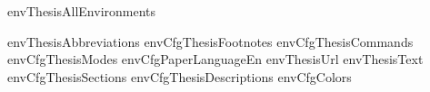 \startenvironment envThesisAllEnvironments

\environment envThesisAbbreviations
\environment envCfgThesisFootnotes
\environment envCfgThesisCommands
\environment envCfgThesisModes
\environment envCfgPaperLanguageEn
\environment envThesisUrl
\environment envThesisText
\environment envCfgThesisSections
\environment envCfgThesisDescriptions
\environment envCfgColors

\stopenvironment